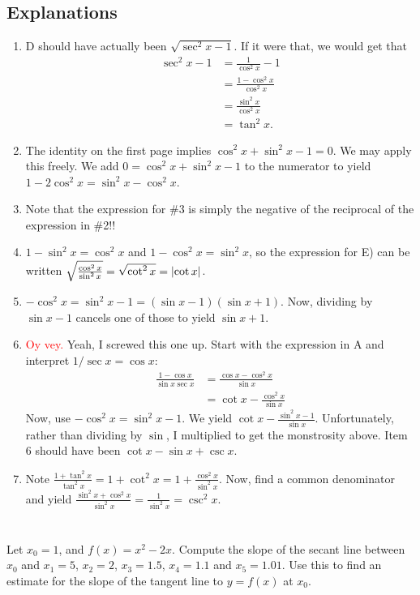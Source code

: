 \documentclass[english]{article}
\DeclarePairedDelimiter\abs{\lvert}{\rvert}%
\newcommand{\prob}[1]{\setcounter{section}{#1-1}\section{}}
\newcommand{\prt}[1]{\setcounter{subsection}{#1-1}\subsection{}}
\theoremstyle{remark}
\theoremstyle{definition}
\begin{document}
\subsection*{Explanations}
\begin{enumerate}
\item D should have actually been $\sqrt{\sec^2x-1}$. If it were that, we would get that \begin{align*}
	\sec^2x-1&=\frac{1}{\cos^2x}-1\\&=\frac{1-\cos^2x}{\cos^2x}\\&=\frac{\sin^2x}{\cos^2x}\\&=\tan^2x.
\end{align*}
\item The identity on the first page implies $\cos^2x+\sin^2x-1=0$. We may apply this freely. We add $0=\cos^2x+\sin^2x-1$ to the numerator to yield $1-2\cos^2x=\sin^2x-\cos^2x$.
\item Note that the expression for \#3 is simply the negative of the reciprocal of the expression in \#2!!
\item $1-\sin^2x=\cos^2x$ and $1-\cos^2x=\sin^2x$, so the expression for E) can be written $\sqrt{\frac{\cos^2x}{\sin^2x}}=\sqrt{\cot^2x}=\abs{\cot x}$.
\item $-\cos^2x=\sin^2x-1=(\sin x-1)(\sin x+1)$. Now, dividing by $\sin x-1$ cancels one of those to yield $\sin x+1$. 
\item \textcolor{red}{Oy vey.} Yeah, I screwed this one up. Start with the expression in A and interpret $1/\sec x=\cos x$:
\begin{align*}
	\frac{1-\cos x}{\sin x \sec x}&= \frac{\cos x-\cos^2x}{\sin x}\\&=\cot x-\frac{\cos^2x}{\sin x}
\end{align*}
Now, use $-\cos^2x=\sin^2x-1$. We yield $\cot x-\frac{\sin^2x-1}{\sin x}$. Unfortunately, rather than dividing by $\sin$, I multiplied to get the monstrosity above. Item 6 should have been $\cot x-\sin x+\csc x$. 
\item Note $\frac{1+\tan^2x}{\tan^2x}=1+\cot^2x=1+\frac{\cos^2x}{\sin^2x}$. Now, find a common denominator and yield $\frac{\sin^2x+\cos^2x}{\sin^2x}=\frac{1}{\sin^2x}=\csc^2x$. 
\end{enumerate}

\prob{2}\prt{1}
Let $x_0=1$, and $f(x)=x^2-2x$. Compute the slope of the secant line between $x_0$ and $x_1=5$, $x_2=2$, $x_3=1.5$, $x_4=1.1$ and $x_5=1.01$. Use this to find an estimate for the slope of the tangent line to $y=f(x)$ at $x_0$.
\end{document}
